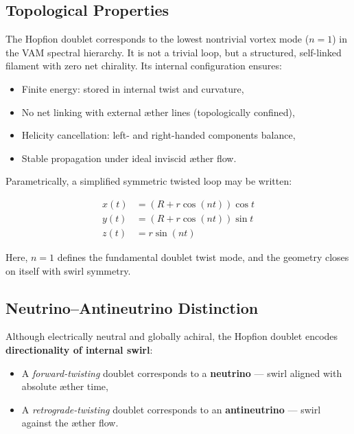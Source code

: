 \subsection{Topological Properties}

The Hopfion doublet corresponds to the lowest nontrivial vortex mode (\(n = 1\)) in the VAM spectral hierarchy. It is not a trivial loop, but a structured, self-linked filament with zero net chirality. Its internal configuration ensures:

\begin{itemize}
    \item Finite energy: stored in internal twist and curvature,
    \item No net linking with external æther lines (topologically confined),
    \item Helicity cancellation: left- and right-handed components balance,
    \item Stable propagation under ideal inviscid æther flow.
\end{itemize}

Parametrically, a simplified symmetric twisted loop may be written:

\begin{equation}
\begin{aligned}
x(t) &= \left( R + r \cos(n t) \right) \cos t \\
y(t) &= \left( R + r \cos(n t) \right) \sin t \\
z(t) &= r \sin(n t)
\end{aligned}
\end{equation}

Here, \(n = 1\) defines the fundamental doublet twist mode, and the geometry closes on itself with swirl symmetry.

\subsection{Neutrino–Antineutrino Distinction}

Although electrically neutral and globally achiral, the Hopfion doublet encodes \textbf{directionality of internal swirl}:

\begin{itemize}
    \item A \emph{forward-twisting} doublet corresponds to a \textbf{neutrino} — swirl aligned with absolute æther time,
    \item A \emph{retrograde-twisting} doublet corresponds to an \textbf{antineutrino} — swirl against the æther flow.
\end{itemize}

